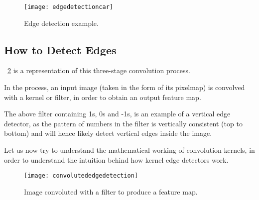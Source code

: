 	\begin{figure}[h]
		\centering
		\texttt{[image: edgedetectioncar]}
		\caption[Edge detection example]{Edge detection example.}
		\label{fig:edgedetectioncar}
	\end{figure}

	\subsection{How to Detect Edges}

	\begin{bulletedlist}
		\item \figurename~\ref{fig:convolutededgedetection} is a representation of this three-stage convolution process.
		\item In the process, an input image (taken in the form of its pixelmap) is convolved with a kernel or filter, 	in order to obtain an output feature map.
		\item The above filter containing 1s, 0s and -1s, is an example of a vertical edge detector, as the pattern of numbers in the filter is vertically consistent (top to bottom) and will hence likely detect vertical edges inside the image.
		\item Let us now try to understand the mathematical working of convolution kernels, in order to understand the intuition behind how kernel edge detectors work.
	\end{bulletedlist}

	\begin{figure}[h]
		\centering
		\texttt{[image: convolutededgedetection]}
		\caption{Image convoluted with a filter to produce a feature map.}
		\label{fig:convolutededgedetection}
	\end{figure}

